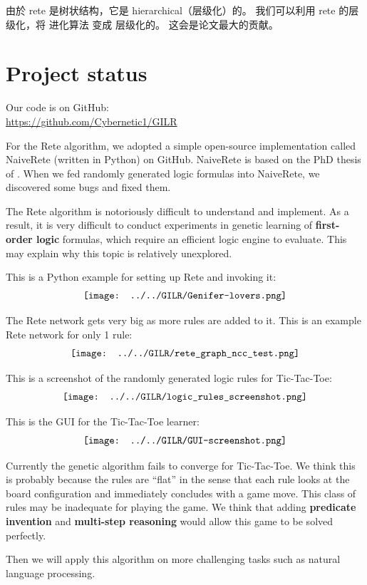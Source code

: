 由於 rete 是树状结构，它是 hierarchical（层级化）的。 我们可以利用 rete 的层级化，将 进化算法 变成 层级化的。 这会是论文最大的贡献。

\section{Project status}

Our code is on GitHub: \\
\href{https://github.com/Cybernetic1/GILR}{https://github.com/Cybernetic1/GILR}

For the Rete algorithm, we adopted a simple open-source implementation called NaiveRete (written in Python) on GitHub.  NaiveRete is based on the PhD thesis of \cite{Doorenbos1995}.  When we fed randomly generated logic formulas into NaiveRete, we discovered some bugs and fixed them.

The Rete algorithm is notoriously difficult to understand and implement.  As a result, it is very difficult to conduct experiments in genetic learning of \textbf{first-order logic} formulas, which require an efficient logic engine to evaluate.  This may explain why this topic is relatively unexplored.

This is a Python example for setting up Rete and invoking it:
\begin{equation}
\vcenter{\hbox{\texttt{[image: ../../GILR/Genifer-lovers.png]}}}
\end{equation}

The Rete network gets very big as more rules are added to it.  This is an example Rete network for only 1 rule:
\begin{equation}
\vcenter{\hbox{\texttt{[image: ../../GILR/rete\_graph\_ncc\_test.png]}}}
\end{equation}

This is a screenshot of the randomly generated logic rules for Tic-Tac-Toe:
\begin{equation}
\vcenter{\hbox{\texttt{[image: ../../GILR/logic\_rules\_screenshot.png]}}}
\end{equation}

This is the GUI for the Tic-Tac-Toe learner:
\begin{equation}
\vcenter{\hbox{\texttt{[image: ../../GILR/GUI-screenshot.png]}}}
\end{equation}

Currently the genetic algorithm fails to converge for Tic-Tac-Toe.  We think this is probably because the rules are ``flat'' in the sense that each rule looks at the board configuration and immediately concludes with a game move.  This class of rules may be inadequate for playing the game.  We think that adding \textbf{predicate invention} and \textbf{multi-step reasoning} would allow this game to be solved perfectly.

Then we will apply this algorithm on more challenging tasks such as natural language processing.

\printbibliography

